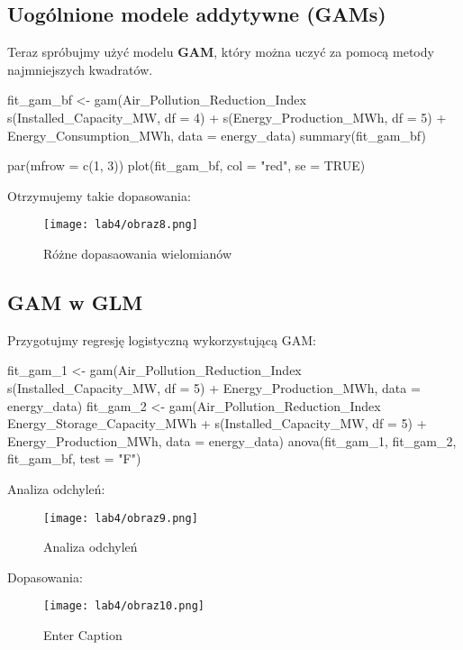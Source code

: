 \subsection{Uogólnione modele addytywne (GAMs)}
Teraz spróbujmy użyć modelu \textbf{GAM}, który można uczyć za pomocą metody najmniejszych kwadratów.

\begin{Rcode}
fit_gam_bf <- gam(Air_Pollution_Reduction_Index ~ s(Installed_Capacity_MW, df = 4) + s(Energy_Production_MWh, df = 5) + Energy_Consumption_MWh, data = energy_data)
summary(fit_gam_bf)

par(mfrow = c(1, 3))
plot(fit_gam_bf, col = "red", se = TRUE)
\end{Rcode}

Otrzymujemy takie dopasowania:
\begin{figure}[H]
    \centering
    \texttt{[image: lab4/obraz8.png]}
    \caption{Różne dopasaowania wielomianów}
    \label{fig:enter-label}
\end{figure}

\subsection{GAM w GLM}
Przygotujmy regresję logistyczną wykorzystującą GAM:

\begin{Rcode}
fit_gam_1 <- gam(Air_Pollution_Reduction_Index ~ s(Installed_Capacity_MW, df = 5) + Energy_Production_MWh, data = energy_data)
fit_gam_2 <- gam(Air_Pollution_Reduction_Index ~ Energy_Storage_Capacity_MWh + s(Installed_Capacity_MW, df = 5) + Energy_Production_MWh, data = energy_data)
anova(fit_gam_1, fit_gam_2, fit_gam_bf, test = "F")
\end{Rcode}

Analiza odchyleń:

\begin{figure}[H]
    \centering
    \texttt{[image: lab4/obraz9.png]}
    \caption{Analiza odchyleń}
    \label{fig:enter-label}
\end{figure}

Dopasowania:

\begin{figure}[H]
    \centering
    \texttt{[image: lab4/obraz10.png]}
    \caption{Enter Caption}
    \label{fig:enter-label}
\end{figure}
